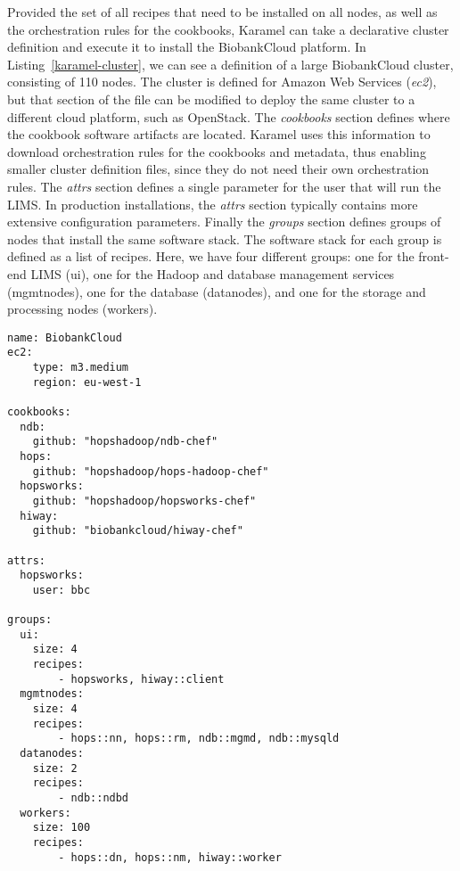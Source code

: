 Provided the set of all recipes that need to be installed on all nodes, as well as the orchestration rules for the cookbooks, Karamel can take a declarative cluster definition and execute it to install the BiobankCloud platform. In Listing~\ref{karamel-cluster}, we can see a definition of a large BiobankCloud cluster, consisting of 110 nodes. The cluster is defined for Amazon Web Services (\textit{ec2}), but that section of the file can be modified to deploy the same cluster to a different cloud platform, such as OpenStack. The \textit{cookbooks} section defines where the cookbook software artifacts are located. Karamel uses this information to download orchestration rules for the cookbooks and metadata, thus enabling smaller cluster definition files, since they do not need their own orchestration rules. The \textit{attrs} section defines a single parameter for the user that will run the LIMS. In production installations, the \textit{attrs} section typically contains more extensive configuration parameters. Finally the \textit{groups} section defines groups of nodes that install the same software stack. The software stack for each group is defined as a list of recipes. Here, we have four different groups: one for the front-end LIMS (ui), one for the Hadoop and database management services (mgmtnodes), one for the database (datanodes), and one for the storage and processing nodes (workers).

\begin{lstlisting}[frame=shadowbox,label=karamel-cluster,caption=Karamel Cluster Definition for BiobankCloud,float=t]
name: BiobankCloud
ec2:
    type: m3.medium
    region: eu-west-1

cookbooks:
  ndb: 
    github: "hopshadoop/ndb-chef"
  hops: 
    github: "hopshadoop/hops-hadoop-chef"
  hopsworks: 
    github: "hopshadoop/hopsworks-chef"
  hiway: 
    github: "biobankcloud/hiway-chef"
    
attrs:
  hopsworks:
    user: bbc
    
groups: 
  ui:
    size: 4
    recipes: 
        - hopsworks, hiway::client
  mgmtnodes:
    size: 4
    recipes: 
        - hops::nn, hops::rm, ndb::mgmd, ndb::mysqld
  datanodes:
    size: 2
    recipes: 
        - ndb::ndbd
  workers:
    size: 100
    recipes: 
        - hops::dn, hops::nm, hiway::worker
\end{lstlisting}